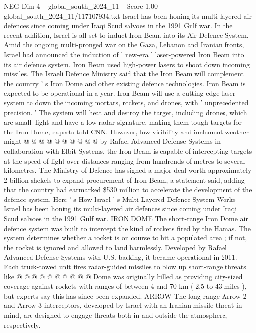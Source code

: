 \begin{textsample}{NEG Dim 4 – global\_south\_2024\_11 – Score 1.00 – global\_south\_2024\_11/117107934.txt}  \label{ex:f4_neg_203}
Israel has been honing its multi-layered air defences since coming under Iraqi Scud salvoes in the 1991 Gulf war.
In the recent addition, Israel is all set to induct Iron Beam into its Air Defence System.
Amid the ongoing multi-pronged war on the Gaza, Lebanon and Iranian fronts, Israel had announced the induction of ' new-era ' laser-powered Iron Beam into its air defence system.
Iron Beam used high-power lasers to shoot down incoming missiles.
The Israeli Defence Ministry said that the Iron Beam will complement the country ' s Iron Dome and other existing defence technologies.
Iron Beam is expected to be operational in a year.
Iron Beam will use a cutting-edge laser system to down the incoming mortars, rockets, and drones, with ' unprecedented precision. ' The system will heat and destroy the target, including drones, which are small, light and have a low radar signature, making them tough targets for the Iron Dome, experts told CNN.
However, low visibility and inclement weather might @ @ @ @ @ @ @ @ @ @ by Rafael Advanced Defense Systems in collaboration with Elbit Systems, the Iron Beam is capable of intercepting targets at the speed of light over distances ranging from hundrends of metres to several kilometres.
The Ministry of Defence has signed a major deal worth approximately 2 billion shekels to expand procurement of Iron Beam, a statement said, adding that the country had earmarked \$530 million to accelerate the development of the defence system.
Here ' s How Israel ' s Multi-Layered Defence System Works Israel has been honing its multi-layered air defences since coming under Iraqi Scud salvoes in the 1991 Gulf war.
IRON DOME The short-range Iron Dome air defence system was built to intercept the kind of rockets fired by the Hamas.
The system determines whether a rocket is on course to hit a populated area ; if not, the rocket is ignored and allowed to land harmlessly.
Developed by Rafael Advanced Defense Systems with U.S. backing, it became operational in 2011.
Each truck-towed unit fires radar-guided missiles to blow up short-range threats like @ @ @ @ @ @ @ @ @ @ Dome was originally billed as providing city-sized coverage against rockets with ranges of between 4 and 70 km ( 2.5 to 43 miles ), but experts say this has since been expanded.
ARROW The long-range Arrow-2 and Arrow-3 interceptors, developed by Israel with an Iranian missile threat in mind, are designed to engage threats both in and outside the atmosphere, respectively.

\end{textsample}
